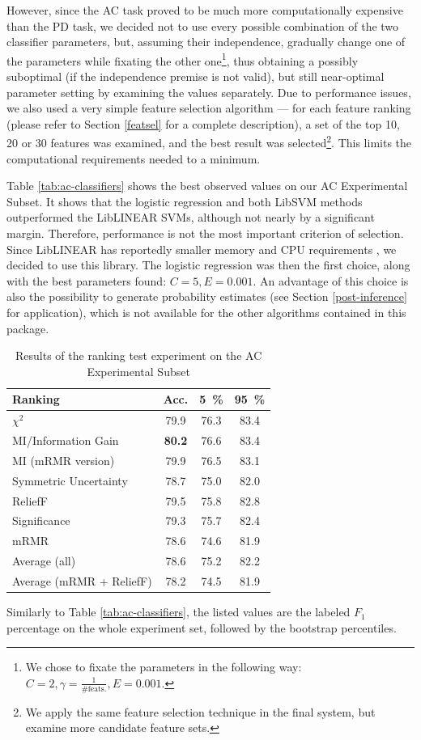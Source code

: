 \documentclass[12pt,notitlepage,a4paper]{report}
\begin{document}
However, since the AC task proved to be much more computationally expensive than the PD task, we decided not to use every possible combination of the two classifier parameters, but, assuming their independence, gradually change one of the parameters while fixating the other one\footnote{We chose to fixate the parameters in the following way: $C = 2, \gamma = \frac{1}{\mbox{\#feats.}}, E = 0.001$.}, thus obtaining a possibly suboptimal (if the independence premise is not valid), but still near-optimal parameter setting by examining the values separately. Due to performance issues, we also used a very simple feature selection algorithm --- for each feature ranking (please refer to Section \ref{featsel} for a complete description), a set of the top 10, 20 or 30 features was examined, and the best result was selected\footnote{We apply the same feature selection technique in the final system, but examine more candidate feature sets.}. This limits the computational requirements needed to a minimum.

Table \ref{tab:ac-classifiers} shows the best observed values on our AC Experimental Subset. It shows that the logistic regression and both LibSVM methods outperformed the LibLINEAR SVMs, although not nearly by a significant margin. Therefore, performance is not the most important criterion of selection. Since LibLINEAR has reportedly smaller memory and CPU requirements \citep[our experiments were not designed to measure this, cf.][]{fan08}, we decided to use this library. The logistic regression was then the first choice, along with the best parameters found: $C = 5, E = 0.001$. An advantage of this choice is also the possibility to generate probability estimates (see Section \ref{post-inference} for application), which is not available for the other algorithms contained in this package.

\begin{table}[htb]
\caption{Results of the ranking test experiment on the AC Experimental Subset}\label{tab:ranker-pc}\footnotesize
\begin{center}
\begin{tabular}{|l|c|c|c|}\hline
\bf Ranking & \bf Acc. & \bf 5~\% & \bf 95~\% \\\hline
$\chi^2$ & 79.9 & 76.3 & 83.4 \\
MI/Information Gain & \bf 80.2 & 76.6 & 83.4 \\
MI (mRMR version) & 79.9 & 76.5 & 83.1 \\
Symmetric Uncertainty & 78.7 & 75.0 & 82.0 \\
ReliefF & 79.5 & 75.8 & 82.8 \\
Significance & 79.3 & 75.7 & 82.4 \\
mRMR & 78.6 & 74.6 & 81.9 \\
Average (all) & 78.6 & 75.2 & 82.2 \\
Average (mRMR + ReliefF) & 78.2 & 74.5 & 81.9 \\\hline
\end{tabular}
\end{center}
Similarly to Table \ref{tab:ac-classifiers}, the listed values are the labeled $F_1$ percentage on the whole experiment set, followed by the bootstrap percentiles.
\end{table}
\end{document}
